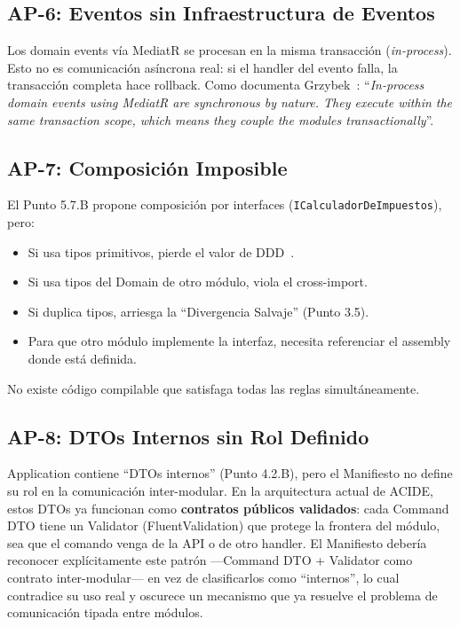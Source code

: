\documentclass[conference]{IEEEtran}
\begin{document}
\subsection{AP-6: Eventos sin Infraestructura de Eventos}
Los domain events v\'ia MediatR se procesan en la misma transacci\'on (\textit{in-process}). Esto no es comunicaci\'on as\'incrona real: si el handler del evento falla, la transacci\'on completa hace rollback. Como documenta Grzybek~\cite{grzybek2019}: ``\textit{In-process domain events using MediatR are synchronous by nature. They execute within the same transaction scope, which means they couple the modules transactionally}''.

\subsection{AP-7: Composici\'on Imposible}
El Punto 5.7.B propone composici\'on por interfaces (\texttt{ICalculadorDeImpuestos}), pero:
\begin{itemize}[leftmargin=1.5em, itemsep=1pt]
    \item Si usa tipos primitivos, pierde el valor de DDD~\cite{evans2003}.
    \item Si usa tipos del Domain de otro m\'odulo, viola el cross-import.
    \item Si duplica tipos, arriesga la ``Divergencia Salvaje'' (Punto 3.5).
    \item Para que otro m\'odulo implemente la interfaz, necesita referenciar el assembly donde est\'a definida.
\end{itemize}
No existe c\'odigo compilable que satisfaga todas las reglas simult\'aneamente.

\subsection{AP-8: DTOs Internos sin Rol Definido}
Application contiene ``DTOs internos'' (Punto 4.2.B), pero el Manifiesto no define su rol en la comunicaci\'on inter-modular. En la arquitectura actual de ACIDE, estos DTOs ya funcionan como \textbf{contratos p\'ublicos validados}: cada Command DTO tiene un Validator (FluentValidation) que protege la frontera del m\'odulo, sea que el comando venga de la API o de otro handler. El Manifiesto deber\'ia reconocer expl\'icitamente este patr\'on ---Command DTO + Validator como contrato inter-modular--- en vez de clasificarlos como ``internos'', lo cual contradice su uso real y oscurece un mecanismo que ya resuelve el problema de comunicaci\'on tipada entre m\'odulos.
\end{document}
